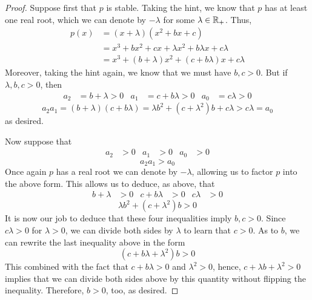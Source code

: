 \documentclass[../psets.tex]{subfiles}
\begin{document}
\begin{enumerate}
\begin{proof}
        Suppose first that $p$ is stable. Taking the hint, we know that $p$ has at least one real root, which we can denote by $-\lambda$ for some $\lambda\in\mathbb{R}_+$. Thus,
        \begin{align*}
            p(x) &= (x+\lambda)(x^2+bx+c)\\
            &= x^3+bx^2+cx+\lambda x^2+b\lambda x+c\lambda\\
            &= x^3+(b+\lambda)x^2+(c+b\lambda)x+c\lambda
        \end{align*}
        Moreover, taking the hint again, we know that we must have $b,c>0$. But if $\lambda,b,c>0$, then
        \begin{align*}
            a_2 &= b+\lambda > 0&
            a_1 &= c+b\lambda > 0&
            a_0 &= c\lambda > 0
        \end{align*}
        \begin{equation*}
            a_2a_1 = (b+\lambda)(c+b\lambda)
            = \lambda b^2+(c+\lambda^2)b+c\lambda
            > c\lambda = a_0
        \end{equation*}
        as desired.\par
        Now suppose that
        \begin{align*}
            a_2 &> 0&
            a_1 &> 0&
            a_0 &> 0
        \end{align*}
        \begin{equation*}
            a_2a_1 > a_0
        \end{equation*}
        Once again $p$ has a real root we can denote by $-\lambda$, allowing us to factor $p$ into the above form. This allows us to deduce, as above, that
        \begin{align*}
            b+\lambda &> 0&
            c+b\lambda &> 0&
            c\lambda &> 0
        \end{align*}
        \begin{equation*}
            \lambda b^2+(c+\lambda^2)b > 0
        \end{equation*}
        It is now our job to deduce that these four inequalities imply $b,c>0$. Since $c\lambda>0$ for $\lambda>0$, we can divide both sides by $\lambda$ to learn that $c>0$. As to $b$, we can rewrite the last inequality above in the form
        \begin{equation*}
            (c+b\lambda+\lambda^2)b > 0
        \end{equation*}
        This combined with the fact that $c+b\lambda>0$ and $\lambda^2>0$, hence, $c+\lambda b+\lambda^2>0$ implies that we can divide both sides above by this quantity without flipping the inequality. Therefore, $b>0$, too, as desired.

\end{proof}
\end{enumerate}
\end{document}
